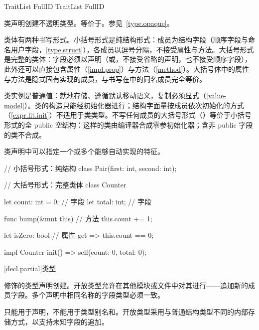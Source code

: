 \begin{bnf}{TraitList}
    FullID \br
    TraitList \terminal{,} FullID
\end{bnf}

\pnum
类声明创建不透明类型。等价于。参见~\ref{type.opaque}。

\pnum
类体有两种书写形式。小括号形式是纯结构形式：成员为结构字段（顺序字段与命名用户字段，\ref{type.struct}），各成员以逗号分隔，不接受属性与方法。大括号形式是完整的类体：字段必须以声明（或，不接受省略的声明，也不接受顺序字段），此外还可以直接包含属性（\ref{impl.prop}）与方法（\ref{method}）。大括号体中的属性与方法是隐式固有实现的成员，与书写在中的同名成员完全等价。

\pnum
类实例是普通值：就地存储、遵循默认移动语义，复制必须显式（\ref{value-model}）。类的构造只能经初始化器进行；结构字面量按成员依次初始化的方式（\ref{expr.lit.init}）不适用于类类型。不写任何成员的大括号形式（\tcode{\{ \}}）等价于小括号形式的全 public 空结构：这样的类由编译器合成零参初始化器；含非 public 字段的类不合成。

\pnum
类声明中可以指定一个或多个能够自动实现的特征。

\enterexample
\begin{codeblock}
// 小括号形式：纯结构
class Pair(first: int, second: int);

// 大括号形式：完整类体
class Counter {
    let count: int = 0;         // 字段
    let total: int;             // 字段

    func bump(&mut this) {      // 方法
        this.count += 1;
    }

    let isZero: bool {          // 属性
        get => this.count == 0;
    }
}

impl Counter {
    init() => self(count: 0, total: 0);
}
\end{codeblock}
\exitexample

[decl.partial]{类型}

\pnum
{}修饰的类型声明创建。开放类型允许在其他模块或文件中对其进行——追加新的成员字段。多个声明中相同名称的字段类型必须一致。

\pnum
{}只能用于声明，不能用于类型别名和。开放类型采用与普通结构类型不同的内部存储方式，以支持未知字段的追加。

